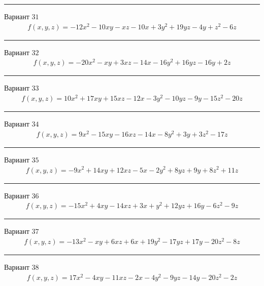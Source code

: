 \documentclass[11pt]{report}
\begin{document}
\begin{center}
\noindent\rule{8cm}{0.4pt}
\end{center}
Вариант $31$
\begin{align*}
    f(x, y, z) = - 12 x^{2} - 10 x y - x z - 10 x + 3 y^{2} + 19 y z - 4 y + z^{2} - 6 z
\end{align*}
\begin{center}
\noindent\rule{8cm}{0.4pt}
\end{center}
Вариант $32$
\begin{align*}
    f(x, y, z) = - 20 x^{2} - x y + 3 x z - 14 x - 16 y^{2} + 16 y z - 16 y + 2 z
\end{align*}
\begin{center}
\noindent\rule{8cm}{0.4pt}
\end{center}
Вариант $33$
\begin{align*}
    f(x, y, z) = 10 x^{2} + 17 x y + 15 x z - 12 x - 3 y^{2} - 10 y z - 9 y - 15 z^{2} - 20 z
\end{align*}
\begin{center}
\noindent\rule{8cm}{0.4pt}
\end{center}
Вариант $34$
\begin{align*}
    f(x, y, z) = 9 x^{2} - 15 x y - 16 x z - 14 x - 8 y^{2} + 3 y + 3 z^{2} - 17 z
\end{align*}
\begin{center}
\noindent\rule{8cm}{0.4pt}
\end{center}
Вариант $35$
\begin{align*}
    f(x, y, z) = - 9 x^{2} + 14 x y + 12 x z - 5 x - 2 y^{2} + 8 y z + 9 y + 8 z^{2} + 11 z
\end{align*}
\begin{center}
\noindent\rule{8cm}{0.4pt}
\end{center}
Вариант $36$
\begin{align*}
    f(x, y, z) = - 15 x^{2} + 4 x y - 14 x z + 3 x + y^{2} + 12 y z + 16 y - 6 z^{2} - 9 z
\end{align*}
\begin{center}
\noindent\rule{8cm}{0.4pt}
\end{center}
Вариант $37$
\begin{align*}
    f(x, y, z) = - 13 x^{2} - x y + 6 x z + 6 x + 19 y^{2} - 17 y z + 17 y - 20 z^{2} - 8 z
\end{align*}
\begin{center}
\noindent\rule{8cm}{0.4pt}
\end{center}
Вариант $38$
\begin{align*}
    f(x, y, z) = 17 x^{2} - 4 x y - 11 x z - 2 x - 4 y^{2} - 9 y z - 14 y - 20 z^{2} - 2 z
\end{align*}
\end{document}
